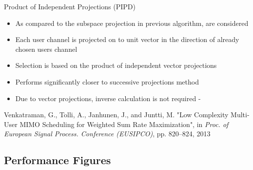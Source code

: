 \documentclass[11pt]{beamer}
\begin{document}
\begin{frame}{Product of Independent Projections (PIPD)\eqn{^\dagger}}
	\begin{itemize}
	\item As compared to the subspace projection in previous algorithm,  are considered
	\item Each user channel is projected on to unit vector in the direction of already chosen users channel
	\item Selection is based on the product of independent vector projections
	\item Performs significantly closer to successive projections method
	\item Due to vector projections, inverse calculation is not required - 
	\end{itemize}
\eqn{^\dagger}\scriptsize{Venkatraman, G., Tolli, A., Janhunen, J., and Juntti, M. "Low Complexity Multi-User MIMO Scheduling for Weighted Sum Rate Maximization", in \emph{Proc. of European Signal Process. Conference (EUSIPCO)}, pp. 820--824, 2013}
\end{frame}

\subsection{Performance Figures}
\end{document}
